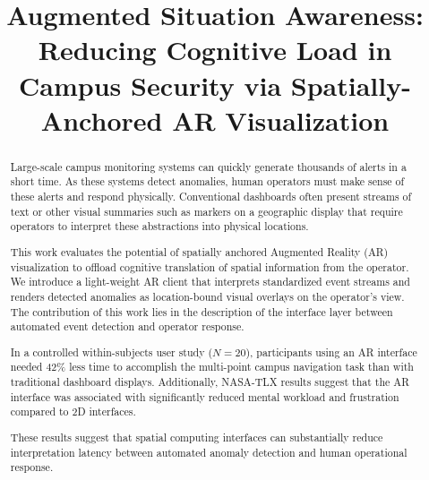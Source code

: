 \documentclass[conference]{IEEEtran}
\begin{document}
\title{Augmented Situation Awareness: Reducing Cognitive Load in Campus Security via Spatially-Anchored AR Visualization}

\author{
}

\maketitle

\begin{abstract}
Large-scale campus monitoring systems can quickly generate thousands of alerts in a short time. As these systems detect anomalies, human operators must make sense of these alerts and respond physically. Conventional dashboards often present streams of text or other visual summaries such as markers on a geographic display that require operators to interpret these abstractions into physical locations.

This work evaluates the potential of spatially anchored Augmented Reality (AR) visualization to offload cognitive translation of spatial information from the operator. We introduce a light-weight AR client that interprets standardized event streams and renders detected anomalies as location-bound visual overlays on the operator’s view. The contribution of this work lies in the description of the interface layer between automated event detection and operator response.

In a controlled within-subjects user study ($N = 20$), participants using an AR interface needed 42\% less time to accomplish the multi-point campus navigation task than with traditional dashboard displays. Additionally, NASA-TLX results suggest that the AR interface was associated with significantly reduced mental workload and frustration compared to 2D interfaces.

These results suggest that spatial computing interfaces can substantially reduce interpretation latency between automated anomaly detection and human operational response.
\end{abstract}
\end{document}

